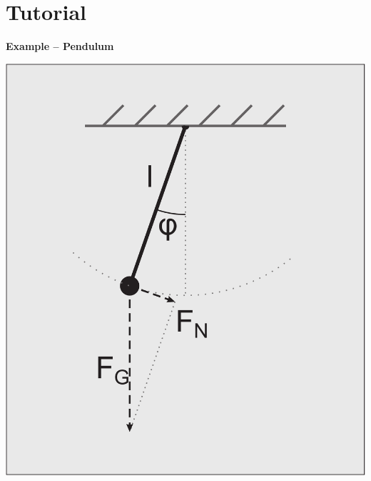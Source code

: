 \section{Tutorial}

\begin{frame}
  \tableofcontents[currentsection] 
\end{frame}


\begin{frame}[fragile]

\centerline{\bf Example -- Pendulum}

\begin{minipage}{0.35\textwidth}
    \includegraphics[draft=false,width=1.0\textwidth]{pendulum.pdf}
\end{minipage}
\hspace{2ex}
\begin{minipage}{0.5\textwidth}
\end{minipage}
\end{frame}
